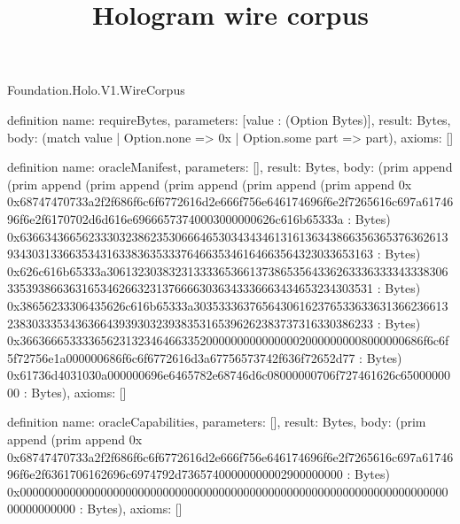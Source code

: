 \begin{lexlean}{Foundation.Holo.V1.WireCorpus}
\title{Hologram wire corpus}
\begin{semanticmodule}
definition{
  name: requireBytes,
  parameters: [value : (Option Bytes)],
  result: Bytes,
  body: (match value | Option.none => 0x | Option.some part => part),
  axioms: []
}

definition{
  name: oracleManifest,
  parameters: [],
  result: Bytes,
  body: (prim append (prim append (prim append (prim append (prim append (prim append 0x 0x68747470733a2f2f686f6c6f6772616d2e666f756e646174696f6e2f7265616c697a6174696f6e2f6170702d6d616e69666573740003000000626c616b65333a : Bytes) 0x63663436656233303238623530666465303434346131613634386635636537636261393430313366353431633836353337646635346164663564323033653163 : Bytes) 0x626c616b65333a306132303832313333653661373865356433626333633334333830633539386636316534626632313766663036343336663434653234303531 : Bytes) 0x38656233306435626c616b65333a3035333637656430616237653363363136623661323830333534363664393930323938353165396262383737316330386233 : Bytes) 0x36636665333365623132346466335200000000000000020000000008000000686f6c6f5f72756e1a000000686f6c6f6772616d3a67756573742f636f72652d77 : Bytes) 0x61736d4031030a000000696e6465782e68746d6c08000000706f727461626c6500000000 : Bytes),
  axioms: []
}

definition{
  name: oracleCapabilities,
  parameters: [],
  result: Bytes,
  body: (prim append (prim append 0x 0x68747470733a2f2f686f6c6f6772616d2e666f756e646174696f6e2f7265616c697a6174696f6e2f6361706162696c6974792d73657400000000002900000000 : Bytes) 0x00000000000000000000000000000000000000000000000000000000000000000000000000000000 : Bytes),
  axioms: []
}


\end{semanticmodule}
\end{lexlean}
